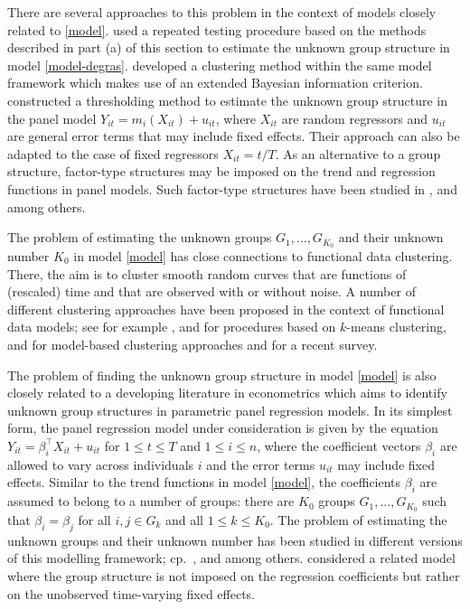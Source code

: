 \documentclass[a4paper,12pt]{article}
\begin{document}
There are several approaches to this problem in the context of models closely related to \eqref{model}. \cite{DegrasWu2012} used a repeated testing procedure based on the methods described in part (a) of this section to estimate the unknown group structure in model \eqref{model-degras}. \cite{Zhang2013} developed a clustering method within the same model framework which makes use of an extended Bayesian information criterion. 
\cite{VogtLinton2017} constructed a thresholding method to estimate the unknown group structure in the panel model $Y_{it} = m_i(X_{it}) + u_{it}$, where $X_{it}$ are random regressors and $u_{it}$ are general error terms that may include fixed effects. Their approach can also be adapted to the case of fixed regressors $X_{it} = t/T$.  As an alternative to a group structure, factor-type structures may be imposed on the trend and regression functions in panel models. Such factor-type structures have been studied in \cite{Kneip2012}, \cite{LintonVogt2015} and \cite{BonevaLintonVogt2016} among others. 


The problem of estimating the unknown groups $G_1,\ldots,G_{K_0}$ and their unknown number $K_0$ in model \eqref{model} has close connections to functional data clustering. There, the aim is to cluster smooth random curves that are functions of (rescaled) time and that are observed with or without noise. A number of different clustering approaches have been proposed in the context of functional data models; see for example \cite{Abraham2003}, \cite{Tarpey2003} and \cite{Tarpey2007} for procedures based on $k$-means clustering, \cite{James2003} and \cite{Chiou2007} for model-based clustering approaches and \cite{Jacques2014} for a recent survey. 


\enlargethispage{0.2cm}
The problem of finding the unknown group structure in model \eqref{model} is also closely related to a developing literature in econometrics which aims to identify unknown group structures in parametric panel regression models. In its simplest form, the panel regression model under consideration is given by the equation $Y_{it} = \beta_i^\top X_{it} + u_{it}$ for $1 \le t \le T$ and $1 \le i \le n$, where the coefficient vectors $\beta_i$ are allowed to vary across individuals $i$ and the error terms $u_{it}$ may include fixed effects. Similar to the trend functions in model \eqref{model}, the coefficients $\beta_i$ are assumed to belong to a number of groups: there are $K_0$ groups $G_1,\ldots,G_{K_0}$ such that $\beta_i = \beta_j$ for all $i,j \in G_k$ and all $1\le k \le K_0$. The problem of estimating the unknown groups and their unknown number has been studied in different versions of this modelling framework; cp.\ \cite{Su2016}, \cite{Su2018} and \cite{Wang2018} among others. \cite{Bonhomme2015} considered a related model where the group structure is not imposed on the regression coefficients but rather on the unobserved time-varying fixed effects. 
\end{document}
